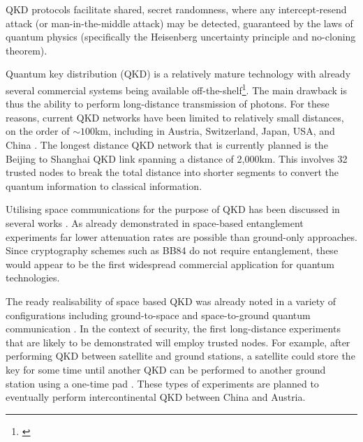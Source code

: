 QKD protocols facilitate shared, secret randomness, where any intercept-resend attack (or man-in-the-middle attack) may be detected, guaranteed by the laws of quantum physics (specifically the Heisenberg uncertainty principle and no-cloning theorem).

Quantum key distribution (QKD) is a relatively mature technology with already several commercial systems being available off-the-shelf\footnote{\cite{??? example companies}}. The main drawback is thus the ability to perform long-distance transmission of photons. For these reasons, current QKD networks have been limited to relatively small distances, on the order of $\sim100$km, including in Austria, Switzerland, Japan, USA, and China \cite{bib:lo2014secure}. The longest distance QKD network that is currently planned is the Beijing to Shanghai QKD link spanning a distance of 2,000km. This involves 32 trusted nodes to break the total distance into shorter segments to convert the quantum information to classical information.

Utilising space communications for the purpose of QKD has been discussed in several works \cite{bib:hughes2000quantum, bib:rarity2002ground, bib:pfennigbauer2003free, bib:aspelmeyer2003long, bib:armengol08}. As already demonstrated in space-based entanglement experiments \cite{bib:yin2017satellite, bib:ren2017ground, bib:liao2017satellite} far lower attenuation rates are possible than ground-only approaches. Since cryptography schemes such as BB84 do not require entanglement, these would appear to be the first widespread commercial application for quantum technologies.  

The ready realisability of space based QKD was already noted in a variety of configurations including ground-to-space and space-to-ground quantum communication \cite{bib:rarity2002ground, bib:aspelmeyer2003long}. In the context of security, the first long-distance experiments that are likely to be demonstrated will employ trusted nodes. For example, after performing QKD between satellite and ground stations, a satellite could store the key for some time until another QKD can be performed to another ground station using a one-time pad \cite{bib:liao2017satellite}. These types of experiments are planned to eventually perform intercontinental QKD between China and Austria.  

